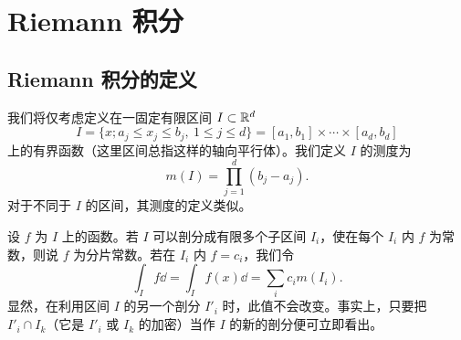 \chapter{Riemann 积分}
\section{Riemann 积分的定义}
我们将仅考虑定义在一固定有限区间 $I\subset\mathbb R^d$
\[
I=\{x;a_j\le x_j\le b_j,\ 1\le j\le d\}=[a_1,b_1]\times\cdots\times[a_d,b_d]
\]
上的有界函数（这里区间总指这样的轴向平行体）。我们定义 $I$ 的测度为
\[m(I)=\prod_{j=1}^d(b_j-a_j).\]
对于不同于 $I$ 的区间，其测度的定义类似。

设 $f$ 为 $I$ 上的函数。若 $I$ 可以剖分成有限多个子区间 $I_i$，使在每个 $I_i$ 内 $f$ 为常数，则说 $f$ 为分片常数。若在 $I_i$ 内 $f=c_i$，我们令
\[\int_I f\dd=\int_I f(x)\dd=\sum_i c_i m(I_i).\]
显然，在利用区间 $I$ 的另一个剖分 $I'_i$ 时，此值不会改变。事实上，只要把 $I'_i\cap I_k$（它是 $I'_i$ 或 $I_k$ 的加密）当作 $I$ 的新的剖分便可立即看出。

